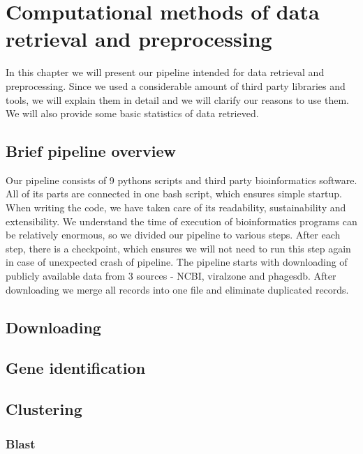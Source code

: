 
\chapter{Computational methods of data retrieval and preprocessing}
In this chapter we will present our pipeline intended for data retrieval and preprocessing.
Since we used a considerable amount of third party libraries and tools, we will explain them in detail and we will clarify our reasons to use them.
We will also provide some basic statistics of data retrieved.

\section{Brief pipeline overview}
Our pipeline consists of 9 pythons scripts and third party bioinformatics software.
All of its parts are connected in one bash script, which ensures simple startup.
When writing the code, we have taken care of its readability, sustainability and extensibility.
We understand the time of execution of bioinformatics programs can be relatively enormous, so we divided our pipeline to various steps.
After each step, there is a checkpoint, which ensures we will not need to run this step again in case of unexpected crash of pipeline.
The pipeline starts with downloading of publicly available data from 3 sources - NCBI, viralzone and phagesdb.
After downloading we merge all records into one file and eliminate duplicated records.

\section{Downloading}
\section{Gene identification}
\section{Clustering}
\subsection{Blast}
